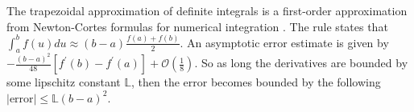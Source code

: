 The trapezoidal approximation of definite integrals is a first-order approximation from Newton-Cortes formulas for numerical integration \cite{numerical}. The rule states that $\int_{a}^{b}f(u)du \approx (b-a)\frac{f(a)+f(b)}{2}$.
An asymptotic error estimate is given by $-\frac { ( b - a ) ^ { 2 } } { 48 } \left[ f ^ { \prime } ( b ) - f ^ { \prime } ( a ) \right] + \mathcal{O} \left( \frac{1}{8} \right)$. So as long the derivatives are bounded by some lipschitz constant $\mathbb{L}$, then the error becomes bounded by the following $|\text{error}| \leq \mathbb{L}( b - a ) ^ { 2 }  $. 






